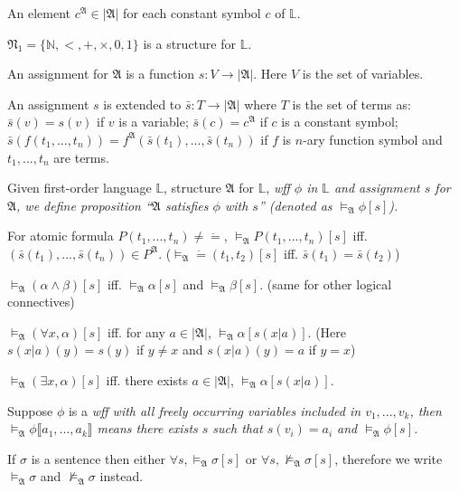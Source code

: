\documentclass{article}
\begin{document}
	 An element $c^{\mathfrak{A}} \in |\mathfrak{A}|$ for each constant symbol $c$ of $\mathbb{L}$.
	
\eg $\mathfrak{N}_1 = \{ \mathbb{N}, <, +, \times, 0, 1\}$ is a structure for $\mathbb{L}$.

 An assignment for $\mathfrak{A}$ is a function $s:V \to |\mathfrak{A}|$. Here $V$ is the set of variables.

 An assignment $s$ is extended to $\bar{s}:T\to |\mathfrak{A}|$ where $T$ is the set of terms as:  $\bar{s}(v)=s(v)$ if $v$ is a variable;  $\bar{s}(c) = c^\mathfrak{A}$ if $c$ is a constant symbol;  $\bar{s}(f(t_1,...,t_n)) = f^{\mathfrak{A}}(\bar{s}(t_1),...,\bar{s}(t_n))$ if $f$ is $n$-ary function symbol and $t_1,...,t_n$ are terms.

	Given first-order language $\mathbb{L}$, structure $\mathfrak{A}$ for $\mathbb{L}$, \it{wff} $\phi$ in $\mathbb{L}$ and assignment $s$ for $\mathfrak{A}$, we define proposition ``$\mathfrak{A}$ satisfies $\phi$ with $s$'' (denoted as $\vDash_{\mathfrak{A}} \phi[s]$).
	
	For atomic formula $P(t_1,...,t_n) \ne \dot=$, $\vDash_\mathfrak{A} P(t_1,...,t_n)[s]$ iff. $(\bar{s}(t_1),...,\bar{s}(t_n)) \in P^{\mathfrak{A}}$. ($\vDash_{\mathfrak{A}} \dot=(t_1,t_2)[s]$ iff. $\bar{s}(t_1)=\bar{s}(t_2)$)
	
	$\vDash_{\mathfrak{A}} (\alpha \land \beta)[s]$ iff. $\vDash_{\mathfrak{A}} \alpha[s]$ and $\vDash_{\mathfrak{A}} \beta[s]$. (same for other logical connectives)
	
	$\vDash_{\mathfrak{A}} (\forall x, \alpha) [s]$ iff. for any $a \in |\mathfrak{A}|$, $\vDash_{\mathfrak{A}} \alpha[s(x|a)]$. (Here $s(x|a)(y)=s(y)$ if $y \ne x$ and $s(x|a)(y)=a$ if $y=x$)
	
	$\vDash_{\mathfrak{A}} (\exists x, \alpha) [s]$ iff. there exists $a \in |\mathfrak{A}|$, $\vDash_{\mathfrak{A}} \alpha[s(x|a)]$.
	
	 Suppose $\phi$ is a \it{wff} with all freely occurring variables included in $v_1,...,v_k$, then $\vDash_{\mathfrak{A}} \phi \llbracket a_1, ..., a_k \rrbracket$ means there exists $s$ such that $s(v_i)=a_i$ and $\vDash_{\mathfrak{A}} \phi[s]$.

	If $\sigma$ is a sentence then either $\forall s, \vDash_{\mathfrak{A}} \sigma[s]$ or $\forall s, \not\vDash_{\mathfrak{A}} \sigma[s]$, therefore we write $\vDash_{\mathfrak{A}} \sigma$ and $\not\vDash_{\mathfrak{A}} \sigma$ instead.
	
\end{document}
